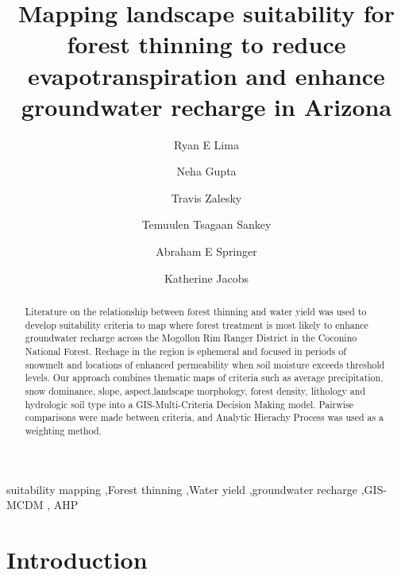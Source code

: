 \documentclass[
  number]{elsarticle}
\begin{document}
\begin{frontmatter}
\title{Mapping landscape suitability for forest thinning to reduce
evapotranspiration and enhance groundwater recharge in Arizona}
\author[1]{Ryan E Lima%
%
}
\author[2]{Neha Gupta%
%
}

\author[2]{Travis Zalesky%
%
}

\author[1]{Temuulen Tsagaan Sankey%
%
}

\author[1]{Abraham E Springer%
%
}

\author[2]{Katherine Jacobs%
%
}









        
\begin{abstract}
Literature on the relationship between forest thinning and water yield
was used to develop suitability criteria to map where forest treatment
is most likely to enhance groundwater recharge across the Mogollon Rim
Ranger District in the Coconino National Forest. Rechage in the region
is ephemeral and focused in periods of snowmelt and locations of
enhanced permeability when soil moisture exceeds threshold levels. Our
approach combines thematic maps of criteria such as average
precipitation, snow dominance, slope, aspect,landscape morphology,
forest density, lithology and hydrologic soil type into a
GIS-Multi-Criteria Decision Making model. Pairwise comparisons were made
between criteria, and Analytic Hierachy Process was used as a weighting
method.
\end{abstract}





\begin{keyword}
    suitability mapping \sep Forest thinning \sep Water
yield \sep groundwater recharge \sep GIS-MCDM \sep 
    AHP
\end{keyword}
\end{frontmatter}
    
\section{Introduction}\label{introduction}
\end{document}
